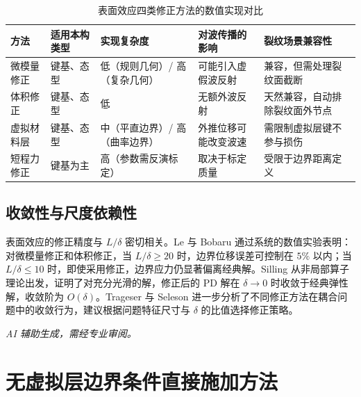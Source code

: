 \begin{table}[htbp]
\centering
\small
\caption{表面效应四类修正方法的数值实现对比}
\label{tab:surface-numerical-compare}
\begin{tabular}{>{\raggedright\arraybackslash}p{}>{\raggedright\arraybackslash}p{}>{\raggedright\arraybackslash}p{}>{\raggedright\arraybackslash}p{}>{\raggedright\arraybackslash}p{}}
\toprule
方法 & 适用本构类型 & 实现复杂度 & 对波传播的影响 & 裂纹场景兼容性 \\
\midrule
微模量修正 & 键基、态型 & 低（规则几何）/ 高（复杂几何） & 可能引入虚假波反射 & 兼容，但需处理裂纹面截断 \\
体积修正 & 键基、态型 & 低 & 无额外波反射 & 天然兼容，自动排除裂纹面外节点 \\
虚拟材料层 & 键基、态型 & 中（平直边界）/ 高（曲率边界） & 外推位移可能改变波速 & 需限制虚拟层键不参与损伤 \\
短程力修正 & 键基为主 & 高（参数需反演标定） & 取决于标定质量 & 受限于边界距离定义 \\
\bottomrule
\end{tabular}
\end{table}

\subsection{收敛性与尺度依赖性}

表面效应的修正精度与 $L/\delta$ 密切相关。Le 与 Bobaru \cite{LeBobaru2018} 通过系统的数值实验表明：对微模量修正和体积修正，当 $L/\delta\ge 20$ 时，边界位移误差可控制在 $5\%$ 以内；当 $L/\delta\le 10$ 时，即使采用修正，边界应力仍显著偏离经典解。Silling \cite{Silling2010,Silling2017} 从非局部算子理论出发，证明了对充分光滑的解，修正后的 PD 解在 $\delta\to 0$ 时收敛于经典弹性解，收敛阶为 $O(\delta)$。Trageser 与 Seleson \cite{TrageserSeleson2020} 进一步分析了不同修正方法在耦合问题中的收敛行为，建议根据问题特征尺寸与 $\delta$ 的比值选择修正策略。

\emph{AI 辅助生成，需经专业审阅。}


\section{无虚拟层边界条件直接施加方法}

